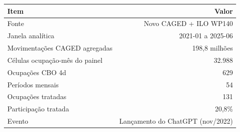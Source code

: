 \scriptsize
\begin{tabular}{lr}
\toprule
Item & Valor \\
\midrule
Fonte & Novo CAGED + ILO WP140 \\
Janela analítica & 2021-01 a 2025-06 \\
Movimentações CAGED agregadas & 198,8 milhões \\
Células ocupação-mês do painel & 32.988 \\
Ocupações CBO 4d & 629 \\
Períodos mensais & 54 \\
Ocupações tratadas & 131 \\
Participação tratada & 20,8\% \\
Evento & Lançamento do ChatGPT (nov/2022) \\
\bottomrule
\end{tabular}
